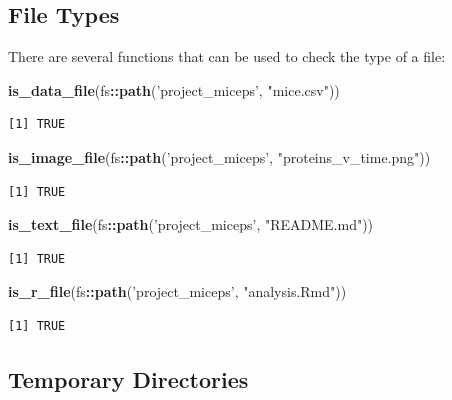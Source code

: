 \documentclass[12pt,twoside]{reedthesis}
\newenvironment{Shaded}{\begin{snugshade}}{\end{snugshade}}
\newcommand{\KeywordTok}[1]{\textcolor[rgb]{0.13,0.29,0.53}{\textbf{#1}}}
\newcommand{\StringTok}[1]{\textcolor[rgb]{0.31,0.60,0.02}{#1}}
\newcommand{\OperatorTok}[1]{\textcolor[rgb]{0.81,0.36,0.00}{\textbf{#1}}}
\newcommand{\NormalTok}[1]{#1}
\begin{document}
\subsection{File Types}\label{file-types}

There are several functions that can be used to check the type of a
file:

\footnotesize
\begin{Shaded}
\begin{Highlighting}[]
\KeywordTok{is_data_file}\NormalTok{(fs}\OperatorTok{::}\KeywordTok{path}\NormalTok{(}\StringTok{'project_miceps'}\NormalTok{, }\StringTok{"mice.csv"}\NormalTok{))}
\end{Highlighting}
\end{Shaded}
\begin{verbatim}
[1] TRUE
\end{verbatim}
\begin{Shaded}
\begin{Highlighting}[]
\KeywordTok{is_image_file}\NormalTok{(fs}\OperatorTok{::}\KeywordTok{path}\NormalTok{(}\StringTok{'project_miceps'}\NormalTok{, }\StringTok{"proteins_v_time.png"}\NormalTok{))}
\end{Highlighting}
\end{Shaded}
\begin{verbatim}
[1] TRUE
\end{verbatim}
\begin{Shaded}
\begin{Highlighting}[]
\KeywordTok{is_text_file}\NormalTok{(fs}\OperatorTok{::}\KeywordTok{path}\NormalTok{(}\StringTok{'project_miceps'}\NormalTok{, }\StringTok{"README.md"}\NormalTok{))}
\end{Highlighting}
\end{Shaded}
\begin{verbatim}
[1] TRUE
\end{verbatim}
\begin{Shaded}
\begin{Highlighting}[]
\KeywordTok{is_r_file}\NormalTok{(fs}\OperatorTok{::}\KeywordTok{path}\NormalTok{(}\StringTok{'project_miceps'}\NormalTok{, }\StringTok{"analysis.Rmd"}\NormalTok{))}
\end{Highlighting}
\end{Shaded}
\begin{verbatim}
[1] TRUE
\end{verbatim}
\normalsize

\subsection{Temporary Directories}\label{temporary-directories}
\end{document}
